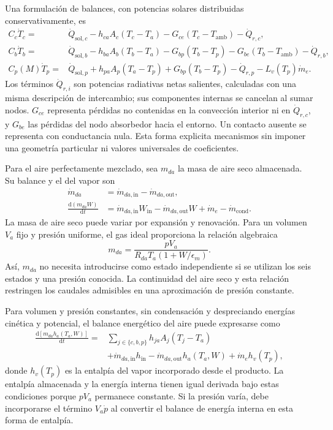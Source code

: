 Una formulación de balances, con potencias solares distribuidas conservativamente, es
\begin{align}
C_c\dot T_c={}&\dot Q_{\mathrm{sol},c}
-h_{ca}A_c(T_c-T_a)-G_{ce}(T_c-T_{\mathrm{amb}})-\dot Q_{r,c},
\label{eq:nodo_cubierta}\\
C_b\dot T_b={}&\dot Q_{\mathrm{sol},b}
-h_{ba}A_b(T_b-T_a)-G_{bp}(T_b-T_p)
-G_{be}(T_b-T_{\mathrm{amb}})-\dot Q_{r,b},
\label{eq:nodo_absorbedor}\\
C_p(M)\dot T_p={}&\dot Q_{\mathrm{sol},p}
+h_{pa}A_p(T_a-T_p)+G_{bp}(T_b-T_p)
-\dot Q_{r,p}-L_v(T_p)\dot m_e.
\label{eq:nodo_producto}
\end{align}
Los términos $\dot Q_{r,i}$ son potencias radiativas netas salientes, calculadas con una misma descripción de intercambio; sus componentes internas se cancelan al sumar nodos. $G_{ce}$ representa pérdidas no contenidas en la convección interior ni en $\dot Q_{r,c}$, y $G_{be}$ las pérdidas del nodo absorbedor hacia el entorno. Un contacto ausente se representa con conductancia nula. Esta forma explicita mecanismos sin imponer una geometría particular ni valores universales de coeficientes.

Para el aire perfectamente mezclado, sea $m_{da}$ la masa de aire seco almacenada. Su balance y el del vapor son
\begin{align}
\dot m_{da}&=\dot m_{da,\mathrm{in}}-\dot m_{da,\mathrm{out}},
\label{eq:balance_aire_seco}\\
\frac{\mathrm{d}(m_{da}W)}{\mathrm{d}t}
&=\dot m_{da,\mathrm{in}}W_{\mathrm{in}}
-\dot m_{da,\mathrm{out}}W+\dot m_e-\dot m_{\mathrm{cond}}.
\label{eq:balance_vapor_lumped}
\end{align}
La masa de aire seco puede variar por expansión y renovación. Para un volumen $V_a$ fijo y presión uniforme, el gas ideal proporciona la relación algebraica
\begin{equation}
m_{da}=\frac{pV_a}{R_{da}T_a(1+W/\epsilon_m)}.
\label{eq:inventario_aire_seco}
\end{equation}
Así, $m_{da}$ no necesita introducirse como estado independiente si se utilizan los seis estados y una presión conocida. La continuidad del aire seco y esta relación restringen los caudales admisibles en una aproximación de presión constante.

Para volumen y presión constantes, sin condensación y despreciando energías cinética y potencial, el balance energético del aire puede expresarse como
\begin{equation}
\begin{aligned}
\frac{\mathrm{d}[m_{da}h_a(T_a,W)]}{\mathrm{d}t}
={}&\sum_{j\in\{c,b,p\}}h_{ja}A_j(T_j-T_a)\\
&+\dot m_{da,\mathrm{in}}h_{\mathrm{in}}
-\dot m_{da,\mathrm{out}}h_a(T_a,W)
+\dot m_e h_v(T_p),
\end{aligned}
\label{eq:balance_entalpia_aire}
\end{equation}
donde $h_v(T_p)$ es la entalpía del vapor incorporado desde el producto. La entalpía almacenada y la energía interna tienen igual derivada bajo estas condiciones porque $pV_a$ permanece constante. Si la presión varía, debe incorporarse el término $V_a\dot p$ al convertir el balance de energía interna en esta forma de entalpía.

